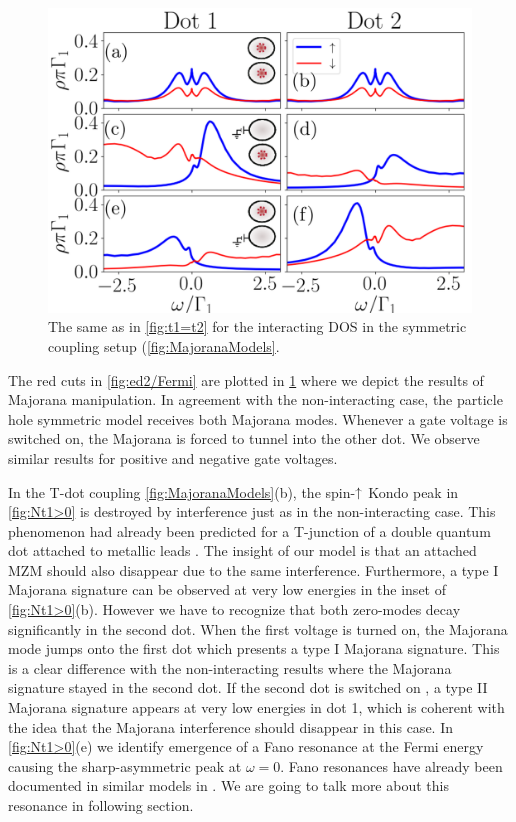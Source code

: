 \begin{figure}[bt]
\begin{center}
\includegraphics[scale=0.5]{IMAGES/NRG/t1=t2.png}
\caption{ \label{fig:Nt1=t2} The same as in \ref{fig:t1=t2} for the  interacting DOS in the symmetric coupling setup (\ref{fig:MajoranaModels}.\protect\Source{}
}
%
\end{center}
\end{figure}

    The red cuts in \ref{fig:ed2/Fermi} are plotted in \ref{fig:Nt1=t2} where we depict the results of Majorana manipulation. In agreement with the non-interacting case, the particle hole symmetric model receives both Majorana modes. Whenever a gate voltage is switched on, the Majorana is forced to tunnel into the other dot. We observe similar results for positive and negative gate voltages. 

 
 In the T-dot coupling \ref{fig:MajoranaModels}(b), the spin-$\uparrow$ Kondo peak in  \ref{fig:Nt1>0} is destroyed by interference just as in the non-interacting case. This phenomenon had already been predicted for a T-junction of a double quantum dot attached to metallic leads \cite{dias_da_silva_transmission_2008}. The insight of our model is that an attached MZM should also disappear due to the same interference. Furthermore, a type I Majorana signature can be observed at very low energies in the inset of \ref{fig:Nt1>0}(b). However we have to recognize that both zero-modes decay significantly in the second dot. When the first voltage is turned on, the Majorana mode jumps onto the first dot which presents a type I Majorana signature. This is a clear difference with the non-interacting results where the Majorana signature stayed in the second dot.  If the second dot is switched on , a type II Majorana signature appears at very low energies in dot 1, which is coherent with the idea that the Majorana interference should disappear in this case. In \ref{fig:Nt1>0}(e) we identify emergence of a Fano resonance at the Fermi energy causing the sharp-asymmetric peak at $\omega = 0$. Fano resonances have already been documented in similar models in \cite{schuray_fano_2017}. We are going to talk more about this resonance in following section. 



